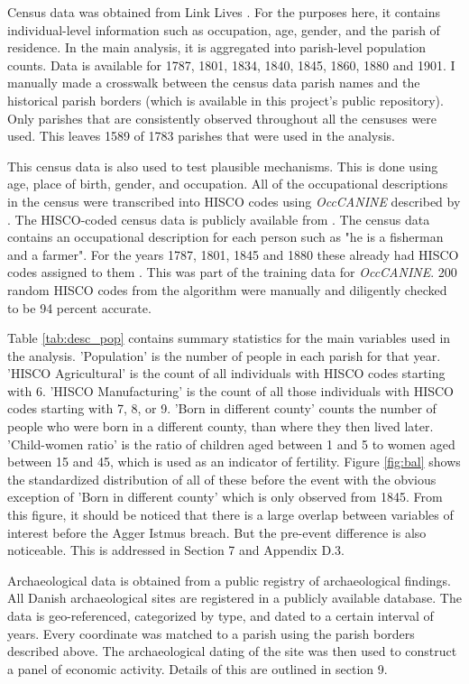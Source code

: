 \documentclass[11pt]{article}
\begin{document}
Census data was obtained from Link Lives \citep{mathiesen2022linklives}. For the purposes here, it contains individual-level information such as occupation, age, gender, and the parish of residence. In the main analysis, it is aggregated into parish-level population counts. Data is available for 1787, 1801, 1834, 1840, 1845, 1860, 1880 and 1901. I manually made a crosswalk between the census data parish names and the historical parish borders (which is available in this project's public repository). Only parishes that are consistently observed throughout all the censuses were used. This leaves 1589 of 1783 parishes that were used in the analysis. 

This census data is also used to test plausible mechanisms. This is done using age, place of birth, gender, and occupation. All of the occupational descriptions in the census were transcribed into HISCO codes using \textit{OccCANINE} described by \cite{dahl2024breaking}. The HISCO-coded census data is publicly available from \cite{dk_hisco_data}. The census data contains an occupational description for each person such as "he is a fisherman and a farmer". For the years 1787, 1801, 1845 and 1880 these already had HISCO codes assigned to them \citep{ddd_method2015}. This was part of the training data for \textit{OccCANINE}. 200 random HISCO codes from the algorithm were manually and diligently checked to be 94 percent accurate. 

Table \ref{tab:desc_pop} contains summary statistics for the main variables used in the analysis. 'Population' is the number of people in each parish for that year. 'HISCO Agricultural' is the count of all individuals with HISCO codes starting with 6. 'HISCO Manufacturing' is the count of all those individuals with HISCO codes starting with 7, 8, or 9. 'Born in different county' counts the number of people who were born in a different county, than where they then lived later. 'Child-women ratio' is the ratio of children aged between 1 and 5 to women aged between 15 and 45, which is used as an indicator of fertility. Figure \ref{fig:bal} shows the standardized distribution of all of these before the event with the obvious exception of 'Born in different county' which is only observed from 1845. From this figure, it should be noticed that there is a large overlap between variables of interest before the Agger Istmus breach. But the pre-event difference is also noticeable. This is addressed in Section 7 and Appendix D.3. 

Archaeological data is obtained from a public registry of archaeological findings. All Danish archaeological sites are registered in a publicly available database. The data is geo-referenced, categorized by type, and dated to a certain interval of years. Every coordinate was matched to a parish using the parish borders described above. The archaeological dating of the site was then used to construct a panel of economic activity. Details of this are outlined in section 9.
\end{document}
